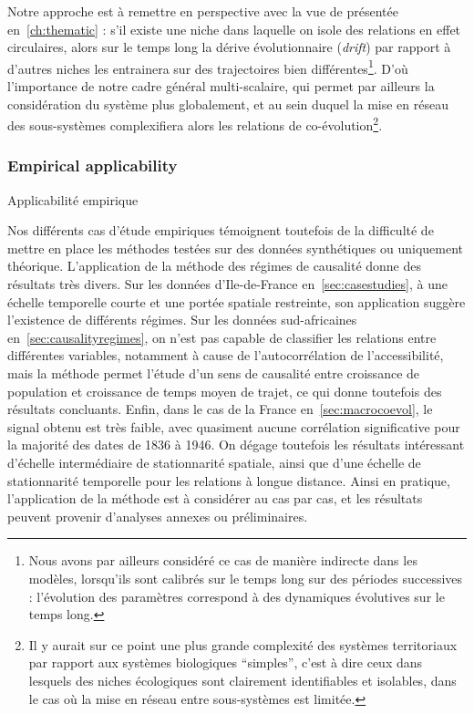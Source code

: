 Notre approche est à remettre en perspective avec la vue de  présentée en~\ref{ch:thematic} : s'il existe une niche dans laquelle on isole des relations en effet circulaires, alors sur le temps long la dérive évolutionnaire (\emph{drift}) par rapport à d'autres niches les entrainera sur des trajectoires bien différentes\footnote{Nous avons par ailleurs considéré ce cas de manière indirecte dans les modèles, lorsqu'ils sont calibrés sur le temps long sur des périodes successives : l'évolution des paramètres correspond à des dynamiques évolutives sur le temps long.}. D'où l'importance de notre cadre général multi-scalaire, qui permet par ailleurs la considération du système plus globalement, et au sein duquel la mise en réseau des sous-systèmes complexifiera alors les relations de co-évolution\footnote{Il y aurait sur ce point une plus grande complexité des systèmes territoriaux par rapport aux systèmes biologiques ``simples'', c'est à dire ceux dans lesquels des niches écologiques sont clairement identifiables et isolables, dans le cas où la mise en réseau entre sous-systèmes est limitée.}.





\subsubsection{Empirical applicability}{Applicabilité empirique}

Nos différents cas d'étude empiriques témoignent toutefois de la difficulté de mettre en place les méthodes testées sur des données synthétiques ou uniquement théorique. L'application de la méthode des régimes de causalité donne des résultats très divers. Sur les données d'Ile-de-France en~\ref{sec:casestudies}, à une échelle temporelle courte et une portée spatiale restreinte, son application suggère l'existence de différents régimes. Sur les données sud-africaines en~\ref{sec:causalityregimes}, on n'est pas capable de classifier les relations entre différentes variables, notamment à cause de l'autocorrélation de l'accessibilité, mais la méthode permet l'étude d'un sens de causalité entre croissance de population et croissance de temps moyen de trajet, ce qui donne toutefois des résultats concluants. Enfin, dans le cas de la France en~\ref{sec:macrocoevol}, le signal obtenu est très faible, avec quasiment aucune corrélation significative pour la majorité des dates de 1836 à 1946. On dégage toutefois les résultats intéressant d'échelle intermédiaire de stationnarité spatiale, ainsi que d'une échelle de stationnarité temporelle pour les relations à longue distance. Ainsi en pratique, l'application de la méthode est à considérer au cas par cas, et les résultats peuvent provenir d'analyses annexes ou préliminaires.


